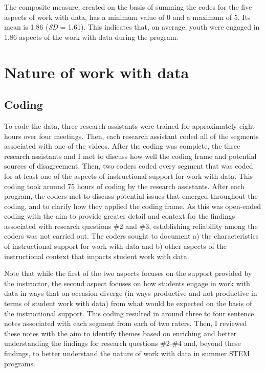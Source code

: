 \documentclass[]{book}
\theoremstyle{definition}
\theoremstyle{definition}
\theoremstyle{definition}
\theoremstyle{remark}
\begin{document}
The composite measure, created on the basis of summing the codes for the
five aspects of work with data, has a minimum value of 0 and a maximum
of 5. Its mean is 1.86 (\emph{SD} = 1.61). This indicates that, on
average, youth were engaged in 1.86 aspects of the work with data during
the program.

\section{Nature of work with data}\label{nature-of-work-with-data}

\subsection{Coding}\label{coding}

To code the data, three research assistants were trained for
approximately eight hours over four meetings. Then, each research
assistant coded all of the segments associated with one of the videos.
After the coding was complete, the three research assistants and I met
to discuss how well the coding frame and potential sources of
disagreement. Then, two coders coded every segment that was coded for at
least one of the aspects of instructional support for work with data.
This coding took around 75 hours of coding by the research assistants.
After each program, the coders met to discuss potential issues that
emerged throughout the coding, and to clarify how they applied the
coding frame. As this was open-ended coding with the aim to provide
greater detail and context for the findings associated with research
questions \#2 and \#3, establishing reliability among the coders was not
carried out. The coders sought to document a) the characteristics of
instructional support for work with data and b) other aspects of the
instructional context that impacts student work with data.

Note that while the first of the two aspects focuses on the support
provided by the instructor, the second aspect focuses on how students
engage in work with data in ways that on occasion diverge (in ways
productive and not productive in terms of student work with data) from
what would be expected on the basis of the instructional support. This
coding resulted in around three to four sentence notes associated with
each segment from each of two raters. Then, I reviewed these notes with
the aim to identify themes based on enriching and better understanding
the findings for research questions \#2-\#4 and, beyond these findings,
to better understand the nature of work with data in summer STEM
programs.
\end{document}
